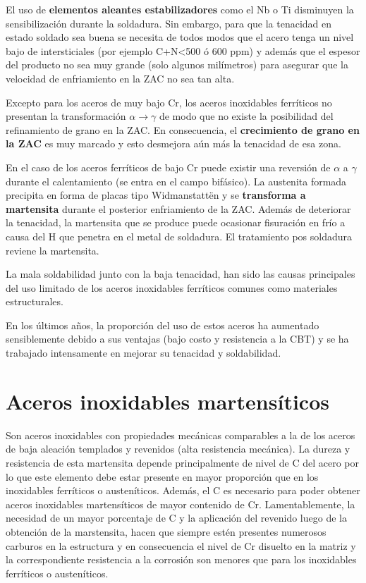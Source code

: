El uso de \textbf{elementos aleantes estabilizadores} como el Nb o Ti disminuyen la sensibilización durante la soldadura. Sin embargo, para que la tenacidad en estado soldado sea buena se necesita de todos modos que el acero tenga un nivel bajo de intersticiales (por ejemplo C+N<500 ó 600 ppm) y además que el espesor del producto no sea muy grande (solo algunos milímetros) para asegurar que la velocidad de enfriamiento en la ZAC no sea tan alta.

Excepto para los aceros de muy bajo Cr, los aceros inoxidables ferríticos no presentan la transformación $\alpha\rightarrow\gamma$ de modo que no existe la posibilidad del refinamiento de grano en la ZAC. En consecuencia, el \textbf{crecimiento de grano en la ZAC} es muy marcado y esto desmejora aún más la tenacidad de esa zona.

En el caso de los aceros ferríticos de bajo Cr puede existir una reversión de $\alpha$ a $\gamma$ durante el calentamiento (se entra en el campo bifásico). La austenita formada precipita en forma de placas tipo Widmanstattën y se \textbf{transforma a martensita} durante el posterior enfriamiento de la ZAC. Además de deteriorar la tenacidad, la martensita que se produce puede ocasionar fisuración en frío a causa del H que penetra en el metal de soldadura. El tratamiento pos soldadura reviene la martensita.

La mala soldabilidad junto con la baja tenacidad, han sido las causas principales del uso limitado de los aceros inoxidables ferríticos comunes como materiales estructurales.

En los últimos años, la proporción del uso de estos aceros ha aumentado sensiblemente debido a sus ventajas (bajo costo y resistencia a la CBT) y se ha trabajado intensamente en mejorar su tenacidad y soldabilidad.

\section{Aceros inoxidables martensíticos}
Son aceros inoxidables con propiedades mecánicas comparables a la de los aceros de baja aleación templados y revenidos (alta resistencia mecánica). La dureza y resistencia de esta martensita depende principalmente de nivel de C del acero por lo que este elemento debe estar presente en mayor proporción que en los inoxidables ferríticos o austeníticos. Además, el C es necesario para poder obtener aceros inoxidables martensíticos de mayor contenido de Cr. Lamentablemente, la necesidad de un mayor porcentaje de C y la aplicación del revenido luego de la obtención de la marstensita, hacen que siempre estén presentes numerosos carburos en la estructura y en consecuencia el nivel de Cr disuelto en la matriz y la correspondiente resistencia a la corrosión son menores que para los inoxidables ferríticos o austeníticos. 

